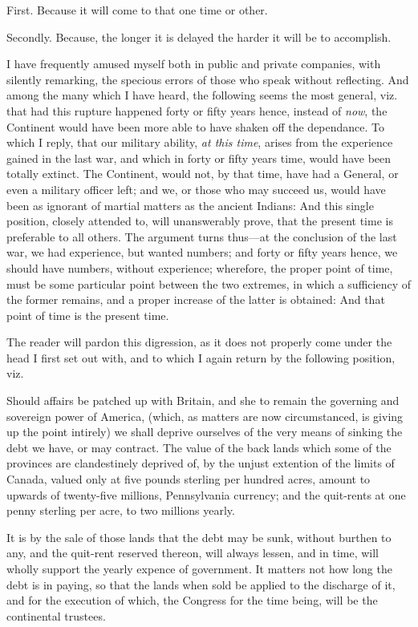 \documentclass[12pt, twocolumn]{book}
\begin{document}
    First. Because it will come to that one time or other.

    Secondly. Because, the longer it is delayed the harder it will be to accomplish.

    I have frequently amused myself both in public and private companies, with silently remarking, the specious errors of those who speak without reflecting. And among the many which I have heard, the following seems the most general, viz. that had this rupture happened forty or fifty years hence, instead of \textit{now}, the Continent would have been more able to have shaken off the dependance. To which I reply, that our military ability, \textit{at this time}, arises from the experience gained in the last war, and which in forty or fifty years time, would have been totally extinct. The Continent, would not, by that time, have had a General, or even a military officer left; and we, or those who may succeed us, would have been as ignorant of martial matters as the ancient Indians: And this single position, closely attended to, will unanswerably prove, that the present time is preferable to all others. The argument turns thus—at the conclusion of the last war, we had experience, but wanted numbers; and forty or fifty years hence, we should have numbers, without experience; wherefore, the proper point of time, must be some particular point between the two extremes, in which a sufficiency of the former remains, and a proper increase of the latter is obtained: And that point of time is the present time.

    The reader will pardon this digression, as it does not properly come under the head I first set out with, and to which I again return by the following position, viz.

    Should affairs be patched up with Britain, and she to remain the governing and sovereign power of America, (which, as matters are now circumstanced, is giving up the point intirely) we shall deprive ourselves of the very means of sinking the debt we have, or may contract. The value of the back lands which some of the provinces are clandestinely deprived of, by the unjust extention of the limits of Canada, valued only at five pounds sterling per hundred acres, amount to upwards of twenty-five millions, Pennsylvania currency; and the quit-rents at one penny sterling per acre, to two millions yearly.

    It is by the sale of those lands that the debt may be sunk, without burthen to any, and the quit-rent reserved thereon, will always lessen, and in time, will wholly support the yearly expence of government. It matters not how long the debt is in paying, so that the lands when sold be applied to the discharge of it, and for the execution of which, the Congress for the time being, will be the continental trustees.
\end{document}
